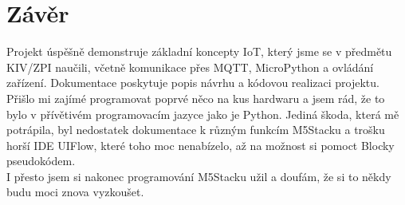 \documentclass[a4paper,12pt]{article}
\begin{document}
\section{Závěr}
Projekt úspěšně demonstruje základní koncepty IoT, který jsme se v předmětu KIV/ZPI naučili, včetně komunikace přes MQTT, MicroPython a ovládání zařízení. Dokumentace poskytuje popis návrhu a kódovou realizaci projektu.\\
Přišlo mi zajímé programovat poprvé něco na kus hardwaru a jsem rád, že to bylo v přívětivém programovacím jazyce jako je Python. Jediná škoda, která mě potrápila, byl nedostatek dokumentace k různým funkcím M5Stacku a trošku horší IDE UIFlow, které toho moc nenabízelo, až na možnost si pomoct Blocky pseudokódem.\\
I přesto jsem si nakonec programování M5Stacku užil a doufám, že si to někdy budu moci znova vyzkoušet.
\end{document}
